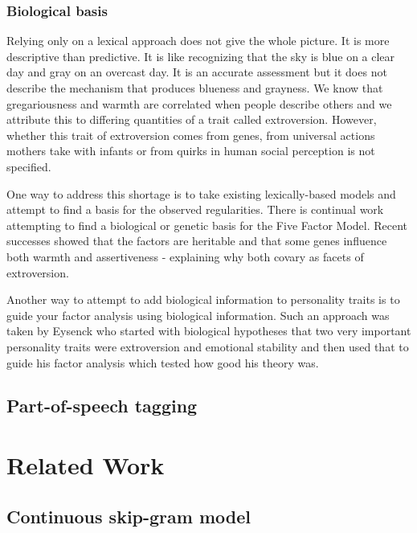 \documentclass[eric_thesis.tex]{subfiles}
\begin{document}
\subsection{Biological basis}

Relying only on a lexical approach does not give the whole picture. It is more
descriptive than predictive. It is like recognizing that the sky is blue on a
clear day and gray on an overcast day. It is an accurate assessment but it does
not describe the mechanism that produces blueness and grayness. 
We know that gregariousness and warmth are 
correlated when people describe others and we attribute this to differing
quantities of a trait called extroversion. However, whether this trait of
extroversion comes from genes, from universal actions mothers take with 
infants or from quirks in human social perception is not specified.

One way to address this shortage is to take existing lexically-based models and
attempt to find a basis for the observed regularities. There is continual work
attempting to find a biological or genetic basis for the Five Factor Model.
Recent successes showed that the factors are heritable  and that some genes influence both warmth and 
assertiveness - explaining why both covary as facets of 
extroversion. 

Another way to attempt to add biological information to personality traits is
to guide your factor analysis using biological information. Such an approach
was taken by Eysenck who started with biological hypotheses that two very 
important personality traits were extroversion and emotional stability and
then used that to guide his factor analysis which tested how good his theory
was.

\section{Part-of-speech tagging}

\chapter{Related Work}

\section{Continuous skip-gram model}
\end{document}
